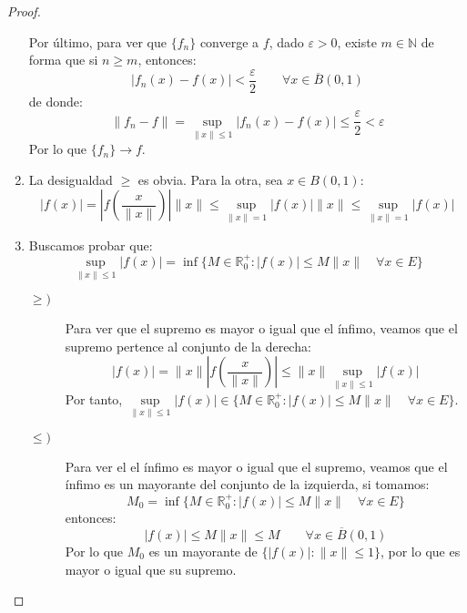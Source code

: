 \begin{prop}
\begin{proof}
\begin{enumerate}
                Por último, para ver que $\{f_n\}$ converge a $f$, dado $\varepsilon>0$, existe $m\in \mathbb{N}$ de forma que si $n\geq m$, entonces:
                \begin{equation*}
                    |f_n(x) - f(x)| < \dfrac{\varepsilon}{2} \qquad \forall x\in \overline{B}(0,1)
                \end{equation*}
                de donde:
                \begin{equation*}
                    \|f_n - f\| = \sup_{\|x\|\leq 1} |f_n(x) - f(x)| \leq \dfrac{\varepsilon}{2} < \varepsilon
                \end{equation*}
                Por lo que $\{f_n\}\to f$.
            \item La desigualdad $\geq$ es obvia. Para la otra, sea $x\in B(0,1)$:
                \begin{equation*}
                    |f(x)| = \left|f\left(\frac{x}{\|x\|}\right)\right|\|x\| \leq \sup_{\|x\|=1}|f(x)|\|x\| \leq \sup_{\|x\|=1}|f(x)|
                \end{equation*}
            \item Buscamos probar que:
                \begin{equation*}
                    \sup_{\|x\|\leq 1}|f(x)| = \inf\{M\in \mathbb{R}^+_0 : |f(x)| \leq M\|x\| \quad \forall x\in E\}
                \end{equation*}
                \begin{description}
                    \item [$\geq)$] Para ver que el supremo es mayor o igual que el ínfimo, veamos que el supremo pertence al conjunto de la derecha:
                        \begin{equation*}
                            |f(x)| = \|x\| \left|f\left(\dfrac{x}{\|x\|}\right)\right| \leq \|x\| \sup_{\|x\|\leq 1}|f(x)|
                        \end{equation*}
                        Por tanto, $\sup\limits_{\|x\|\leq1}|f(x)| \in \{M\in \mathbb{R}^+_0 : |f(x)|\leq M\|x\| \quad \forall x\in E\}$.
                    \item [$\leq)$] Para ver el el ínfimo es mayor o igual que el supremo, veamos que el ínfimo es un mayorante del conjunto de la izquierda, si tomamos:
                        \begin{equation*}
                            M_0 = \inf\{M\in \mathbb{R}^+_0 : |f(x)| \leq M\|x\| \quad \forall x\in E\}
                        \end{equation*}
                        entonces:
                        \begin{equation*}
                            |f(x)| \leq M\|x\| \leq M  \qquad \forall x\in \overline{B}(0,1)
                        \end{equation*}
                        Por lo que $M_0$ es un mayorante de $\{|f(x)| : \|x\| \leq 1\}$, por lo que es mayor o igual que su supremo.
                \end{description}
        \end{enumerate}
    \end{proof}
\end{prop}

